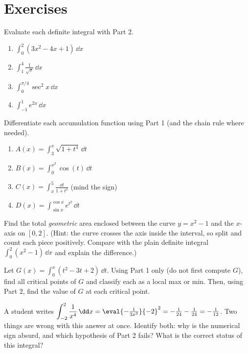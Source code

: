 \section{Exercises}

\begin{exercise}
Evaluate each definite integral with Part 2.
\begin{enumerate}[label=(\alph*)]
  \item $\displaystyle\int_0^2 (3x^2 - 4x + 1)\,\dd x$
  \item $\displaystyle\int_1^4 \frac{1}{\sqrt{x}}\,\dd x$
  \item $\displaystyle\int_0^{\pi/4}\sec^2 x\,\dd x$
  \item $\displaystyle\int_{-1}^{1} e^{2x}\,\dd x$
\end{enumerate}
\end{exercise}

\begin{exercise}
Differentiate each accumulation function using Part 1 (and the chain rule where
needed).
\begin{enumerate}[label=(\alph*)]
  \item $\displaystyle A(x)=\int_3^x \sqrt{1+t^4}\,\dd t$
  \item $\displaystyle B(x)=\int_0^{x^2} \cos(t)\,\dd t$
  \item $\displaystyle C(x)=\int_x^{5} \frac{\dd t}{1+t^2}$ (mind the sign)
  \item $\displaystyle D(x)=\int_{\sin x}^{\cos x} e^{t^2}\,\dd t$
\end{enumerate}
\end{exercise}

\begin{exercise}
Find the total \emph{geometric} area enclosed between the curve $y=x^2-1$ and the
$x$-axis on $[0,2]$. (Hint: the curve crosses the axis inside the interval, so
split and count each piece positively. Compare with the plain definite integral
$\int_0^2(x^2-1)\,\dd x$ and explain the difference.)
\end{exercise}

\begin{exercise}
Let $G(x)=\int_0^x (t^2 - 3t + 2)\,\dd t$. Using Part 1 only (do not first compute
$G$), find all critical points of $G$ and classify each as a local max or min.
Then, using Part 2, find the value of $G$ at each critical point.
\end{exercise}

\begin{exercise}[Conceptual]
A student writes $\displaystyle\int_{-2}^{2}\frac{1}{x^4}\,\dd x =
\eval{-\tfrac{1}{3x^3}}{-2}^{2} = -\tfrac{1}{24}-\tfrac{1}{24}=-\tfrac{1}{12}$.
Two things are wrong with this answer at once. Identify both: why is the numerical
sign absurd, and which hypothesis of Part 2 fails? What is the correct status of
this integral?
\end{exercise}

